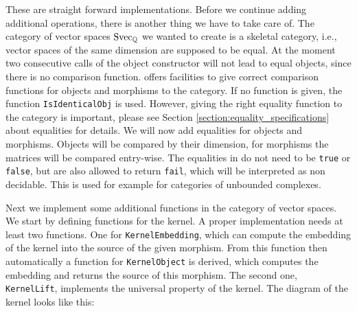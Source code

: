 

These are straight forward implementations. Before we continue
adding additional operations, there is another thing we have to take care of. The category of vector spaces $\mathrm{Svec}_{\mathbb{Q}}$ we wanted
to create is a skeletal category, i.e., vector spaces of the same dimension are supposed to be equal. At the moment
two consecutive calls of the object constructor will not lead to equal objects, since there is no comparison function.
\CapPkg offers facilities to give correct comparison functions for objects and morphisms to the category. If no function
is given, the \GAP function \texttt{IsIdenticalObj} is used. However, giving the right equality function to the
category is important, please see Section \ref{section:equality_specifications} about equalities for details. We will now add equalities
for objects and morphisms. Objects will be compared by their dimension, for morphisms the matrices will be compared entry-wise.
The equalities in \CapPkg do not need to be \texttt{true} or \texttt{false}, but are also allowed to return \texttt{fail},
which will be interpreted as non decidable. This is used for example for categories of unbounded complexes.



Next we implement some additional functions in the category of vector spaces. We start by defining functions for the kernel.
A proper implementation needs at least two functions. One for \texttt{KernelEmbedding}, which can compute the embedding of the kernel
into the source of the given morphism. From this function then automatically a function for \texttt{KernelObject} is derived, which
computes the embedding and returns the source of this morphism. The second one, \texttt{KernelLift}, implements the universal property of the kernel.
The diagram of the kernel looks like this:
\begin{center}
\end{center}

